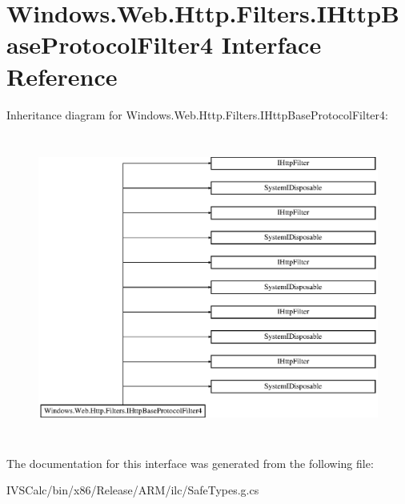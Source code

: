 \hypertarget{interface_windows_1_1_web_1_1_http_1_1_filters_1_1_i_http_base_protocol_filter4}{}\section{Windows.\+Web.\+Http.\+Filters.\+I\+Http\+Base\+Protocol\+Filter4 Interface Reference}
\label{interface_windows_1_1_web_1_1_http_1_1_filters_1_1_i_http_base_protocol_filter4}
Inheritance diagram for Windows.\+Web.\+Http.\+Filters.\+I\+Http\+Base\+Protocol\+Filter4\+:\begin{figure}[H]
\begin{center}
\leavevmode
\includegraphics[height=10.131579cm]{interface_windows_1_1_web_1_1_http_1_1_filters_1_1_i_http_base_protocol_filter4}
\end{center}
\end{figure}


The documentation for this interface was generated from the following file\+:\begin{DoxyCompactItemize}
\item 
I\+V\+S\+Calc/bin/x86/\+Release/\+A\+R\+M/ilc/Safe\+Types.\+g.\+cs\end{DoxyCompactItemize}
